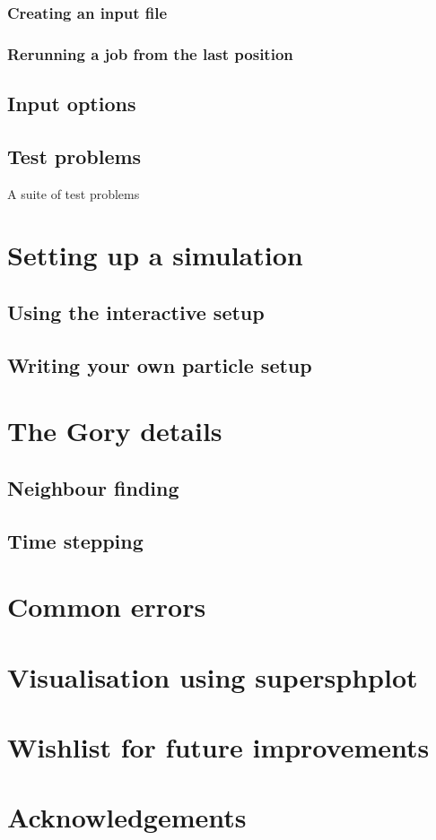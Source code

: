 \documentclass[a4paper,12pt]{article}
\begin{document}
\subsubsection{Creating an input file}

\subsubsection{Rerunning a job from the last position}

\subsection{Input options}

\subsection{Test problems}
 A suite of test problems

\section{Setting up a simulation}

\subsection{Using the interactive setup}

\subsection{Writing your own particle setup}

\section{The Gory details}

\subsection{Neighbour finding}

\subsection{Time stepping}

\section{Common errors}

\section{Visualisation using supersphplot}

\section{Wishlist for future improvements}

\section*{Acknowledgements}
\end{document}
